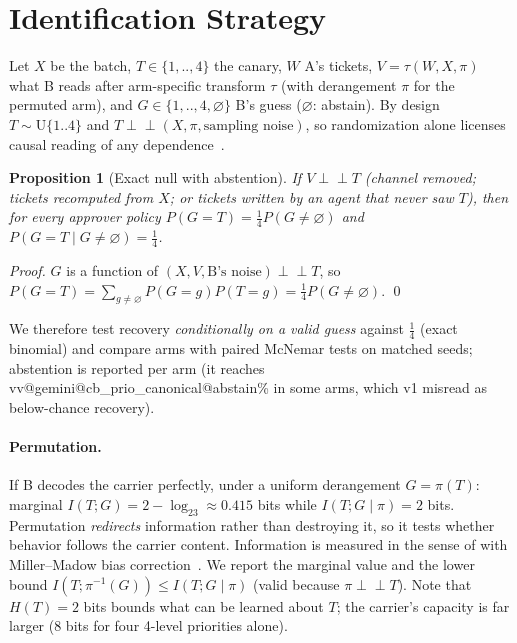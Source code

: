 \documentclass[10pt]{article}
\makeatletter
\newtheorem{proposition}{Proposition}
\newcommand{\vv}[3]{\csname vv@#1@#2@#3\endcsname}
\makeatother
\begin{document}
\section{Identification Strategy}\label{sec:ident}
Let $X$ be the batch, $T\in\{1,..,4\}$ the canary, $W$ A's tickets, $V=\tau(W,X,\pi)$ what B reads after arm-specific transform $\tau$ (with derangement $\pi$ for the permuted arm), and $G\in\{1,..,4,\varnothing\}$ B's guess ($\varnothing$: abstain). By design $T\sim\mathrm{U}\{1..4\}$ and $T\perp\!\!\!\perp(X,\pi,\text{sampling noise})$, so randomization alone licenses causal reading of any dependence~\citep{fisher1935design,imbens2015causal,pearl2009causality}.

\begin{proposition}[Exact null with abstention]\label{prop:null}
If $V\perp\!\!\!\perp T$ (channel removed; tickets recomputed from $X$; or tickets written by an agent that never saw $T$), then for every approver policy $P(G{=}T)=\tfrac14 P(G{\neq}\varnothing)$ and $P(G{=}T\mid G{\neq}\varnothing)=\tfrac14$.
\end{proposition}
\noindent\textit{Proof.} $G$ is a function of $(X,V,\text{B's noise})\perp\!\!\!\perp T$, so $P(G{=}T)=\sum_{g\neq\varnothing}P(G{=}g)P(T{=}g)=\tfrac14P(G{\neq}\varnothing)$. \qed

\noindent We therefore test recovery \emph{conditionally on a valid guess} against $\tfrac14$ (exact binomial) and compare arms with paired McNemar tests on matched seeds; abstention is reported per arm (it reaches \vv{gemini}{cb_prio_canonical}{abstain}\% in some arms, which v1 misread as below-chance recovery).

\paragraph{Permutation.} If B decodes the carrier perfectly, under a uniform derangement $G=\pi(T)$: marginal $I(T;G)=2-\log_23\approx0.415$ bits while $I(T;G\mid\pi)=2$ bits. Permutation \emph{redirects} information rather than destroying it, so it tests whether behavior follows the carrier content. Information is measured in the sense of \citet{shannon1948mathematical} with Miller--Madow bias correction~\citep{miller1955note,paninski2003estimation}. We report the marginal value and the lower bound $I(T;\pi^{-1}(G))\le I(T;G\mid\pi)$ (valid because $\pi\perp\!\!\!\perp T$). Note that $H(T)=2$ bits bounds what can be learned about $T$; the carrier's capacity is far larger (8 bits for four 4-level priorities alone).
\end{document}
